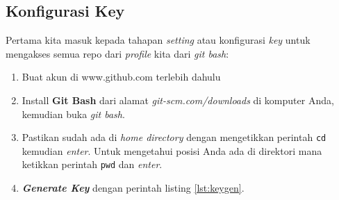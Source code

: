 \subsection{Konfigurasi Key}
Pertama kita masuk kepada tahapan \textit{setting} atau konfigurasi \textit{key} untuk mengakses semua repo dari \textit{profile} kita dari \textit{git bash}:
\begin{enumerate}

\item Buat akun di www.github.com terlebih dahulu
\item Install \textbf{Git Bash} dari alamat \textit{git-scm.com/downloads} di komputer Anda, kemudian buka \textit{git bash}.
\item Pastikan sudah ada di \textit{home directory} dengan mengetikkan perintah \verb|cd| kemudian \textit{enter}. Untuk mengetahui posisi Anda ada di direktori mana ketikkan perintah \verb|pwd| dan \textit{enter}.
\item \textbf{\textit{Generate Key}} dengan perintah listing \ref{lst:keygen}.


\end{enumerate}
